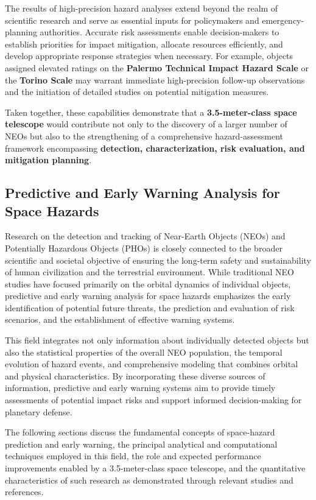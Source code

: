The results of high-precision hazard analyses extend beyond the realm of scientific research and serve as essential inputs for policymakers and emergency-planning authorities. Accurate risk assessments enable decision-makers to establish priorities for impact mitigation, allocate resources efficiently, and develop appropriate response strategies when necessary. For example, objects assigned elevated ratings on the \textbf{Palermo Technical Impact Hazard Scale} or the \textbf{Torino Scale} may warrant immediate high-precision follow-up observations and the initiation of detailed studies on potential mitigation measures.

Taken together, these capabilities demonstrate that a \textbf{3.5-meter-class space telescope} would contribute not only to the discovery of a larger number of NEOs but also to the strengthening of a comprehensive hazard-assessment framework encompassing \textbf{detection, characterization, risk evaluation, and mitigation planning}.

\subsection{Predictive and Early Warning Analysis for Space Hazards}

Research on the detection and tracking of Near-Earth Objects (NEOs) and Potentially Hazardous Objects (PHOs) is closely connected to the broader scientific and societal objective of ensuring the long-term safety and sustainability of human civilization and the terrestrial environment. While traditional NEO studies have focused primarily on the orbital dynamics of individual objects, predictive and early warning analysis for space hazards emphasizes the early identification of potential future threats, the prediction and evaluation of risk scenarios, and the establishment of effective warning systems.

This field integrates not only information about individually detected objects but also the statistical properties of the overall NEO population, the temporal evolution of hazard events, and comprehensive modeling that combines orbital and physical characteristics. By incorporating these diverse sources of information, predictive and early warning systems aim to provide timely assessments of potential impact risks and support informed decision-making for planetary defense.

The following sections discuss the fundamental concepts of space-hazard prediction and early warning, the principal analytical and computational techniques employed in this field, the role and expected performance improvements enabled by a 3.5-meter-class space telescope, and the quantitative characteristics of such research as demonstrated through relevant studies and references.

